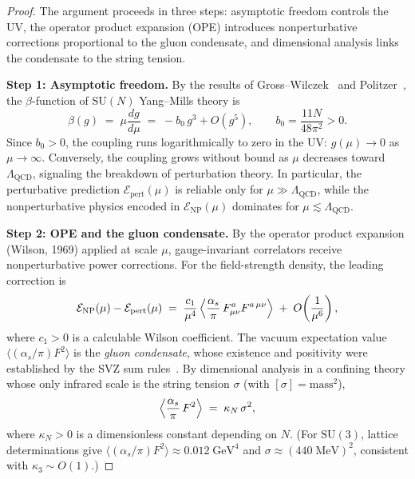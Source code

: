 \documentclass[11pt]{article}
\theoremstyle{definition}
\begin{document}
\begin{proof}
The argument proceeds in three steps: asymptotic freedom controls the UV,
the operator product expansion (OPE) introduces nonperturbative corrections
proportional to the gluon condensate, and dimensional analysis links the
condensate to the string tension.

\medskip
\noindent\textbf{Step 1: Asymptotic freedom.}
By the results of Gross--Wilczek~\cite{GW} and Politzer~\cite{Politzer},
the $\beta$-function of $\mathrm{SU}(N)$ Yang--Mills theory is
\[
  \beta(g) \;=\; \mu \frac{dg}{d\mu} \;=\; -b_0\, g^3 + O(g^5),
  \qquad b_0 = \frac{11N}{48\pi^2} > 0.
\]
Since $b_0 > 0$, the coupling runs logarithmically to zero in the UV:
$g(\mu) \to 0$ as $\mu \to \infty$.  Conversely, the coupling grows without
bound as $\mu$ decreases toward $\Lambda_{\mathrm{QCD}}$, signaling the
breakdown of perturbation theory.  In particular, the perturbative prediction
$\mathcal{E}_{\mathrm{pert}}(\mu)$ is reliable only for $\mu \gg \Lambda_{\mathrm{QCD}}$,
while the nonperturbative physics encoded in $\mathcal{E}_{\mathrm{NP}}(\mu)$
dominates for $\mu \lesssim \Lambda_{\mathrm{QCD}}$.

\medskip
\noindent\textbf{Step 2: OPE and the gluon condensate.}
By the operator product expansion (Wilson, 1969) applied at scale $\mu$,
gauge-invariant correlators receive nonperturbative power corrections.
For the field-strength density, the leading correction is
\[
  \mathcal{E}_{\mathrm{NP}}(\mu) - \mathcal{E}_{\mathrm{pert}}(\mu)
  \;=\; \frac{c_1}{\mu^4}\,
  \Bigl\langle \frac{\alpha_s}{\pi}\, F_{\mu\nu}^a F^{a\,\mu\nu} \Bigr\rangle
  \;+\; O\!\left(\frac{1}{\mu^6}\right),
\]
where $c_1 > 0$ is a calculable Wilson coefficient.  The vacuum expectation
value $\langle (\alpha_s/\pi) F^2 \rangle$ is the \emph{gluon condensate},
whose existence and positivity were established by the SVZ sum
rules~\cite{SVZ}.  By dimensional analysis in a confining theory whose
only infrared scale is the string tension $\sigma$ (with $[\sigma] = \mathrm{mass}^2$),
\[
  \Bigl\langle \frac{\alpha_s}{\pi}\, F^2 \Bigr\rangle
  \;=\; \kappa_N\, \sigma^2,
\]
where $\kappa_N > 0$ is a dimensionless constant depending on $N$.
(For $\mathrm{SU}(3)$, lattice determinations give
$\langle (\alpha_s / \pi) F^2 \rangle \approx 0.012\;\mathrm{GeV}^4$
and $\sigma \approx (440\;\mathrm{MeV})^2$, consistent with $\kappa_3 \sim O(1)$.)


\end{proof}
\end{document}
